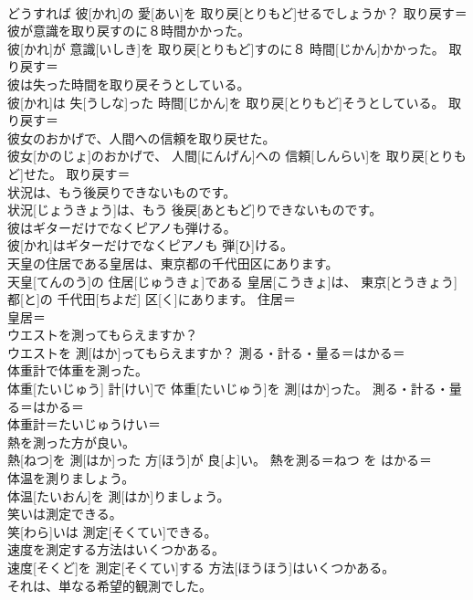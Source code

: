 \documentclass[8pt]{extreport}
\begin{document}
\begin{CJK}{UTF8}{min}
\\	どうすれば 彼[かれ]の 愛[あい]を 取り戻[とりもど]せるでしょうか？	取り戻す＝ 
\\	彼が意識を取り戻すのに８時間かかった。	
\\	彼[かれ]が 意識[いしき]を 取り戻[とりもど]すのに８ 時間[じかん]かかった。	取り戻す＝ 
\\	彼は失った時間を取り戻そうとしている。	
\\	彼[かれ]は 失[うしな]った 時間[じかん]を 取り戻[とりもど]そうとしている。	取り戻す＝ 
\\	彼女のおかげで、人間への信頼を取り戻せた。	
\\	彼女[かのじょ]のおかげで、 人間[にんげん]への 信頼[しんらい]を 取り戻[とりもど]せた。	取り戻す＝ 
\\	状況は、もう後戻りできないものです。	
\\	状況[じょうきょう]は、もう 後戻[あともど]りできないものです。	
\\	彼はギターだけでなくピアノも弾ける。	
\\	彼[かれ]はギターだけでなくピアノも 弾[ひ]ける。	
\\	天皇の住居である皇居は、東京都の千代田区にあります。	
\\	天皇[てんのう]の 住居[じゅうきょ]である 皇居[こうきょ]は、 東京[とうきょう] 都[と]の 千代田[ちよだ] 区[く]にあります。	住居＝ 
\\	皇居＝ 
\\	ウエストを測ってもらえますか？	
\\	ウエストを 測[はか]ってもらえますか？	測る・計る・量る＝はかる＝ 
\\	体重計で体重を測った。	
\\	体重[たいじゅう] 計[けい]で 体重[たいじゅう]を 測[はか]った。	測る・計る・量る＝はかる＝ 
\\	体重計＝たいじゅうけい＝ 
\\	熱を測った方が良い。	
\\	熱[ねつ]を 測[はか]った 方[ほう]が 良[よ]い。	熱を測る＝ねつ を はかる＝ 
\\	体温を測りましょう。	
\\	体温[たいおん]を 測[はか]りましょう。	
\\	笑いは測定できる。	
\\	笑[わら]いは 測定[そくてい]できる。	
\\	速度を測定する方法はいくつかある。	
\\	速度[そくど]を 測定[そくてい]する 方法[ほうほう]はいくつかある。	
\\	それは、単なる希望的観測でした。	

\end{CJK}
\end{document}
